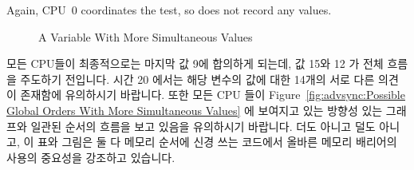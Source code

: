Again, CPU~0 coordinates the test, so does not record any values.
\fi

\begin{figure}
\begin{center}
\end{center}
\caption{A Variable With More Simultaneous Values}
\end{figure}

모든 CPU들이 최종적으로는 마지막 값 9에 합의하게 되는데, 값 15와 12 가 전체
흐름을 주도하기 전입니다.
시간 20 에서는 해당 변수의 값에 대한 14개의 서로 다른 의견이 존재함에
유의하시기 바랍니다.
또한 모든 CPU 들이
Figure~\ref{fig:advsync:Possible Global Orders With More Simultaneous Values}
에 보여지고 있는 방향성 있는 그래프와 일관된 순서의 흐름을 보고 있음을
유의하시기 바랍니다.
더도 아니고 덜도 아니고, 이 표와 그림은 둘 다 메모리 순서에 신경 쓰는 코드에서
올바른 메모리 배리어의 사용의 중요성을 강조하고 있습니다.
\iffalse

